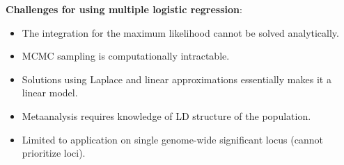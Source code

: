 \documentclass[a0paper,portrait,debug]{baposter}
\begin{document}
\begin{poster}
{\begin{multicols}{2}
  \textbf{Challenges for using multiple logistic regression}:
  \begin{itemize}
    \setlength\itemsep{0.1em}
    \item The integration for the maximum likelihood cannot be solved analytically.
    \item MCMC sampling is computationally intractable.
    \item Solutions using Laplace and linear approximations essentially makes it a linear model.
    \item Metaanalysis requires knowledge of LD structure of the population.
    \item Limited to application on single genome-wide significant locus (cannot prioritize loci).
  \end{itemize}
  \leavevmode\\[0.1em] 
\end{multicols}

}
\end{poster}
\end{document}
